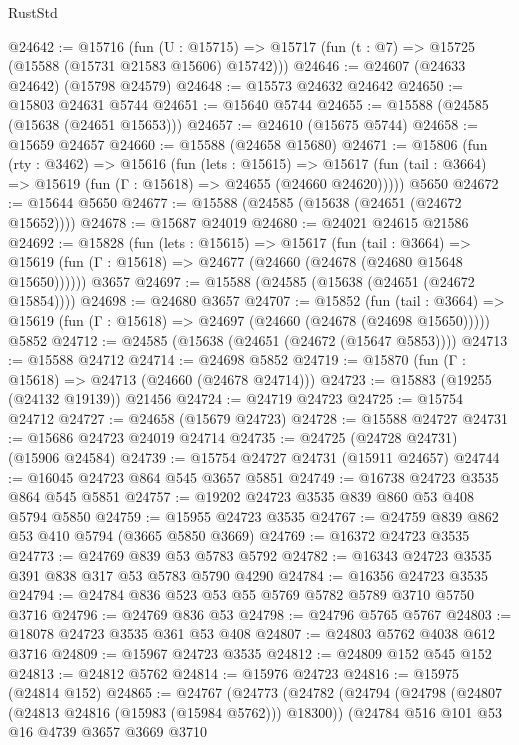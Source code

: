 \begin{lexlean}{RustStd}
\begin{coremodule}
@24642 := @15716
    (fun (U : @15715) => @15717 (fun (t : @7) => @15725 (@15588 (@15731 @21583 @15606) @15742)))
@24646 := @24607 (@24633 @24642) (@15798 @24579)
@24648 := @15573 @24632 @24642
@24650 := @15803 @24631 @5744
@24651 := @15640 @5744
@24655 := @15588 (@24585 (@15638 (@24651 @15653)))
@24657 := @24610 (@15675 @5744)
@24658 := @15659 @24657
@24660 := @15588 (@24658 @15680)
@24671 := @15806
    (fun (rty : @3462) =>
    @15616
      (fun (lets : @15615) =>
      @15617 (fun (tail : @3664) => @15619 (fun (Γ : @15618) => @24655 (@24660 @24620)))))
    @5650
@24672 := @15644 @5650
@24677 := @15588 (@24585 (@15638 (@24651 (@24672 @15652))))
@24678 := @15687 @24019
@24680 := @24021 @24615 @21586
@24692 := @15828
    (fun (lets : @15615) =>
    @15617
      (fun (tail : @3664) =>
      @15619 (fun (Γ : @15618) => @24677 (@24660 (@24678 (@24680 @15648 @15650))))))
    @3657
@24697 := @15588 (@24585 (@15638 (@24651 (@24672 @15854))))
@24698 := @24680 @3657
@24707 := @15852
    (fun (tail : @3664) => @15619 (fun (Γ : @15618) => @24697 (@24660 (@24678 (@24698 @15650)))))
    @5852
@24712 := @24585 (@15638 (@24651 (@24672 (@15647 @5853))))
@24713 := @15588 @24712
@24714 := @24698 @5852
@24719 := @15870 (fun (Γ : @15618) => @24713 (@24660 (@24678 @24714)))
@24723 := @15883 (@19255 (@24132 @19139)) @21456
@24724 := @24719 @24723
@24725 := @15754 @24712
@24727 := @24658 (@15679 @24723)
@24728 := @15588 @24727
@24731 := @15686 @24723 @24019 @24714
@24735 := @24725 (@24728 @24731) (@15906 @24584)
@24739 := @15754 @24727 @24731 (@15911 @24657)
@24744 := @16045 @24723 @864 @545 @3657 @5851
@24749 := @16738 @24723 @3535 @864 @545 @5851
@24757 := @19202 @24723 @3535 @839 @860 @53 @408 @5794 @5850
@24759 := @15955 @24723 @3535
@24767 := @24759 @839 @862 @53 @410 @5794 (@3665 @5850 @3669)
@24769 := @16372 @24723 @3535
@24773 := @24769 @839 @53 @5783 @5792
@24782 := @16343 @24723 @3535 @391 @838 @317 @53 @5783 @5790 @4290
@24784 := @16356 @24723 @3535
@24794 := @24784 @836 @523 @53 @55 @5769 @5782 @5789 @3710 @5750 @3716
@24796 := @24769 @836 @53
@24798 := @24796 @5765 @5767
@24803 := @18078 @24723 @3535 @361 @53 @408
@24807 := @24803 @5762 @4038 @612 @3716
@24809 := @15967 @24723 @3535
@24812 := @24809 @152 @545 @152
@24813 := @24812 @5762
@24814 := @15976 @24723
@24816 := @15975 (@24814 @152)
@24865 := @24767
    (@24773
      (@24782
        (@24794
          (@24798 (@24807 (@24813 @24816 (@15983 (@15984 @5762))) @18300))
          (@24784
            @516
            @101
            @53
            @16
            @4739
            @3657
            @3669
            @3710

\end{coremodule}
\end{lexlean}
